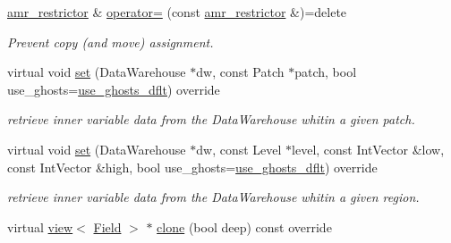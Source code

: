 \begin{DoxyCompactItemize}
\hyperlink{classUintah_1_1PhaseField_1_1detail_1_1amr__restrictor}{amr\+\_\+restrictor} \& \hyperlink{classUintah_1_1PhaseField_1_1detail_1_1amr__restrictor_3_01ScalarField_3_01T_01_4_00_01Problem_05760ee5d1d3adcc969b3f56f71e72acb_ae1d3846e6970b38ddf48c6abc6327ea2}{operator=} (const \hyperlink{classUintah_1_1PhaseField_1_1detail_1_1amr__restrictor}{amr\+\_\+restrictor} \&)=delete
\begin{DoxyCompactList}\small\item\em Prevent copy (and move) assignment. \end{DoxyCompactList}\item 
virtual void \hyperlink{classUintah_1_1PhaseField_1_1detail_1_1amr__restrictor_3_01ScalarField_3_01T_01_4_00_01Problem_05760ee5d1d3adcc969b3f56f71e72acb_aa937cac548dc6bb5ebda0907804d5434}{set} (Data\+Warehouse $\ast$dw, const Patch $\ast$patch, bool use\+\_\+ghosts=\hyperlink{classUintah_1_1PhaseField_1_1detail_1_1amr__restrictor_3_01ScalarField_3_01T_01_4_00_01Problem_05760ee5d1d3adcc969b3f56f71e72acb_a1579c120a731bc2c5e5d53a3e3db51dc}{use\+\_\+ghosts\+\_\+dflt}) override
\begin{DoxyCompactList}\small\item\em retrieve inner variable data from the Data\+Warehouse whitin a given patch. \end{DoxyCompactList}\item 
virtual void \hyperlink{classUintah_1_1PhaseField_1_1detail_1_1amr__restrictor_3_01ScalarField_3_01T_01_4_00_01Problem_05760ee5d1d3adcc969b3f56f71e72acb_a71f5fbbdd3e56e753d19c1d65f5c8467}{set} (Data\+Warehouse $\ast$dw, const Level $\ast$level, const Int\+Vector \&low, const Int\+Vector \&high, bool use\+\_\+ghosts=\hyperlink{classUintah_1_1PhaseField_1_1detail_1_1amr__restrictor_3_01ScalarField_3_01T_01_4_00_01Problem_05760ee5d1d3adcc969b3f56f71e72acb_a1579c120a731bc2c5e5d53a3e3db51dc}{use\+\_\+ghosts\+\_\+dflt}) override
\begin{DoxyCompactList}\small\item\em retrieve inner variable data from the Data\+Warehouse whitin a given region. \end{DoxyCompactList}\item 
virtual \hyperlink{classUintah_1_1PhaseField_1_1detail_1_1view}{view}$<$ \hyperlink{structUintah_1_1PhaseField_1_1ScalarField}{Field} $>$ $\ast$ \hyperlink{classUintah_1_1PhaseField_1_1detail_1_1amr__restrictor_3_01ScalarField_3_01T_01_4_00_01Problem_05760ee5d1d3adcc969b3f56f71e72acb_a7756f69a970700829f04886c454a4b18}{clone} (bool deep) const override

\end{DoxyCompactItemize}
